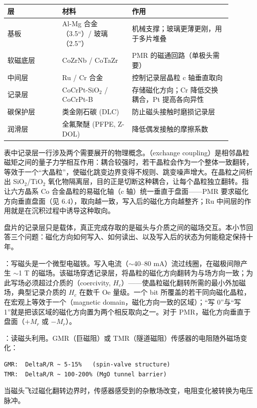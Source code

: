 \begin{longtable}{L{0.22\linewidth}L{0.28\linewidth}L{0.4\linewidth}}
\toprule
层 & 材料 & 作用 \\
\midrule
基板 & Al-Mg 合金（3.5“）/ 玻璃（2.5”） & 机械支撑；玻璃更薄更刚，用于多片堆叠 \\\tablerowrule
软磁底层 & CoZrNb / CoTaZr & PMR 的磁通回路（单极头需要） \\\tablerowrule
中间层 & Ru / Cr 合金 & 控制记录层晶粒 c 轴垂直取向 \\\tablerowrule
记录层 & CoCrPt-SiO$_2$ / CoCrPt-B & 存储磁化方向；Cr 降低交换耦合，Pt 提高各向异性 \\\tablerowrule
碳保护层 & 类金刚石碳 (DLC) & 防止磁头接触时磨损记录层 \\\tablerowrule
润滑层 & 全氟聚醚 (PFPE, Z-DOL) & 降低偶发接触的摩擦系数 \\
\bottomrule
\end{longtable}

表中记录层一行涉及两个需要展开的物理概念。（exchange coupling）是相邻晶粒磁矩之间的量子力学相互作用：耦合较强时，若干晶粒会作为一个整体一致翻转，等效于一个“大晶粒”，使磁化跳变边界变得不规则、跳变噪声增大。在晶粒之间析出 SiO$_2$/TiO$_2$ 氧化物隔离层，目的正是切断这种耦合，让每个晶粒独立翻转。指让六方晶系 Co 合金晶粒的易磁化轴（c 轴）统一垂直于盘面——PMR 要求磁化方向垂直盘面（见 6.4），取向越一致，写入后的磁化方向越整齐；Ru 中间层的作用就是在沉积过程中诱导这种取向。


盘片的记录层只是载体，真正完成存取的是磁头与介质之间的磁场交互。本小节回答三个问题：磁化方向如何写入、如何读出、以及写入后的状态为何能稳定保持十年。

：写磁头是一个微型电磁铁。写入电流（$\sim$40--80 mA）流过线圈，在磁极间隙产生 $\sim$1 T 的磁场。该磁场穿透记录层，将晶粒的磁化方向翻转为与场方向一致；为此写场必须超过介质的（coercivity, $H_c$）——使晶粒磁化翻转所需的最小外加磁场，典型记录介质的 $H_c$ 在数千 Oe 量级。一个 bit 所覆盖的若干同向磁化晶粒，在宏观上等效于一个（magnetic domain，磁化方向一致的区域）；“写 0”与“写 1”就是把该区域的磁化方向置为两个相反取向之一。对于 PMR，磁化方向垂直于盘面（$+M_r$ 或 $-M_r$）。

：读磁头利用。GMR（巨磁阻）或 TMR（隧道磁阻）传感器的电阻随外磁场变化：

\begin{lstlisting}
GMR:  DeltaR/R ~ 5-15%   (spin-valve structure)
TMR:  DeltaR/R ~ 100-200% (MgO tunnel barrier)
\end{lstlisting}
当磁头飞过磁化翻转边界时，传感器感受到的杂散场改变，电阻变化被转换为电压脉冲。

